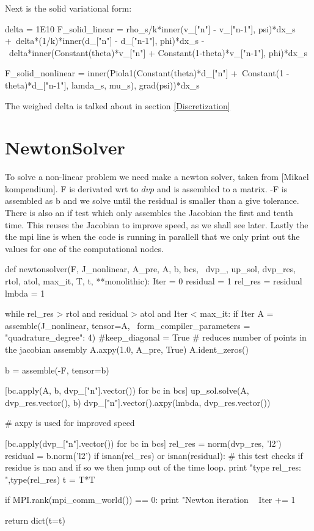 Next is the solid variational form:
\begin{python}
delta = 1E10
F_solid_linear = rho_s/k*inner(v_["n"] - v_["n-1"], psi)*dx_s +\
delta*(1/k)*inner(d_["n"] - d_["n-1"], phi)*dx_s -\
delta*inner(Constant(theta)*v_["n"] + Constant(1-theta)*v_["n-1"], phi)*dx_s

F_solid_nonlinear = inner(Piola1(Constant(theta)*d_["n"] +\
Constant(1 - theta)*d_["n-1"], lamda_s, mu_s), grad(psi))*dx_s
\end{python}

The weighed delta is talked about in section \ref{Discretization}

\section{NewtonSolver}
To solve a non-linear problem we need make a newton solver, taken from [Mikael kompendium]. F is derivated wrt to $dvp$ and is assembled to a matrix. -F is assembled as b and we solve until the residual is smaller than a give tolerance. There is also an if test which only assembles the Jacobian the first and tenth time. This reuses the Jacobian to improve speed, as we shall see later. Lastly the the mpi line is when the code is running in parallell that we only print out the values for one of the computational nodes.  
\begin{python}
def newtonsolver(F, J_nonlinear, A_pre, A, b, bcs, \
                dvp_, up_sol, dvp_res, rtol, atol, max_it, T, t, **monolithic):
    Iter      = 0
    residual   = 1
    rel_res    = residual
    lmbda = 1

    while rel_res > rtol and residual > atol and Iter < max_it:
        if Iter %
            A = assemble(J_nonlinear, tensor=A, \
            form_compiler_parameters = {"quadrature_degree": 4}) #keep_diagonal = True 
            # reduces number of points in the jacobian assembly
            A.axpy(1.0, A_pre, True)
            A.ident_zeros()        

        b = assemble(-F, tensor=b)

        [bc.apply(A, b, dvp_["n"].vector()) for bc in bcs]
        up_sol.solve(A, dvp_res.vector(), b)
        dvp_["n"].vector().axpy(lmbda, dvp_res.vector())  
        
        # axpy is used for improved speed
        
        [bc.apply(dvp_["n"].vector()) for bc in bcs]
        rel_res = norm(dvp_res, 'l2')
        residual = b.norm('l2')
        if isnan(rel_res) or isnan(residual): 
   # this test checks if residue is nan and if so we then jump out of the time loop. 
            print "type rel_res: ",type(rel_res)
            t = T*T

        if MPI.rank(mpi_comm_world()) == 0:
            print "Newton iteration \
        Iter += 1

    return dict(t=t)
\end{python}


